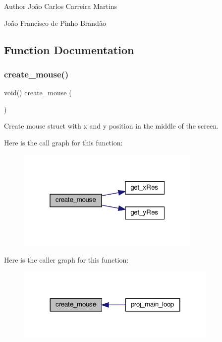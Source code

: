 \begin{DoxyAuthor}{Author}
João Carlos Carreira Martins 

João Francisco de Pinho Brandão 
\end{DoxyAuthor}


\subsection{Function Documentation}
\mbox{\label{group__mouse_gad2dbdfeaa921e9d7a2796bfe003670a7}} 
\subsubsection{\texorpdfstring{create\+\_\+mouse()}{create\_mouse()}}
{\footnotesize\ttfamily void() create\+\_\+mouse (\begin{DoxyParamCaption}{ }\end{DoxyParamCaption})}



Create mouse struct with x and y position in the middle of the screen. 

Here is the call graph for this function\+:
\nopagebreak
\begin{figure}[H]
\begin{center}
\leavevmode
\includegraphics[width=253pt]{group__mouse_gad2dbdfeaa921e9d7a2796bfe003670a7_cgraph}
\end{center}
\end{figure}
Here is the caller graph for this function\+:
\nopagebreak
\begin{figure}[H]
\begin{center}
\leavevmode
\includegraphics[width=276pt]{group__mouse_gad2dbdfeaa921e9d7a2796bfe003670a7_icgraph}
\end{center}
\end{figure}
\mbox{\label{group__mouse_gae5173853c368d50dd463f5c72a63ded9}} 
